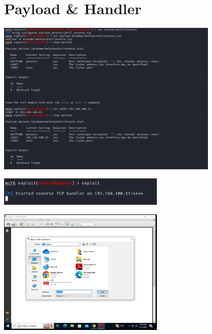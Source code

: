 \section{Payload \& Handler}

\begin{center}
    \includegraphics[width=0.8\textwidth]{Question/SC/13_14_15-.PNG}
\end{center}

\vspace{0.15cm}

\begin{center}
    \includegraphics[width=0.6\textwidth]{Question/SC/16.PNG}
\end{center}

\vspace{0.15cm}

\begin{center}
    \includegraphics[width=0.6\textwidth]{Question/SC/17.PNG}
\end{center}

